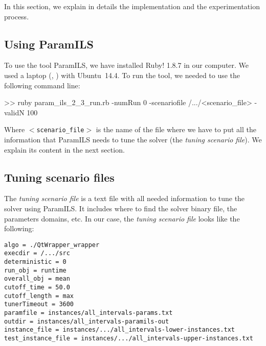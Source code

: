 In this section, we explain in details the implementation and the experimentation process.

\subsection{Using ParamILS}

To use the tool {\sc ParamILS}, we have installed Ruby! 1.8.7 in our computer. We used a laptop \mylaptopName (\mylaptopProc, \mylaptopMemo) with {\sc Ubuntu~14.4}. To run the tool, we needed to use the following command line:

\begin{BGVerbatim}
>> ruby param_ils_2_3_run.rb -numRun 0 -scenariofile /.../<scenario_file> -validN 100
\end{BGVerbatim}

Where \texttt{$<$scenario\_file$>$} is the name of the file where we have to put all the information that {\sc ParamILS} needs to tune the solver (the \textit{tuning scenario file}). We explain its content in the next section.

\subsection{Tuning scenario files}

The {\it tuning scenario file} is a text file with all needed information to tune the solver using {\sc ParamILS}. It includes where to find the solver binary file, the parameters domains, etc. In our case, the {\it tuning scenario file} looks like the following:

\begin{shadedbox}
	\texttt{algo = ./QtWrapper\_wrapper\\
		execdir = /.../src \\
		deterministic = 0 \\
		run\_obj = runtime \\
		overall\_obj = mean \\
		cutoff\_time = 50.0 \\
		cutoff\_length = max \\
		tunerTimeout = 3600 \\
		paramfile = instances/all\_intervals-params.txt \\
		outdir = instances/all\_intervals-paramils-out \\
		instance\_file = instances/.../all\_intervals-lower-instances.txt \\
		test\_instance\_file = instances/.../all\_intervals-upper-instances.txt \\
	}
\end{shadedbox}

